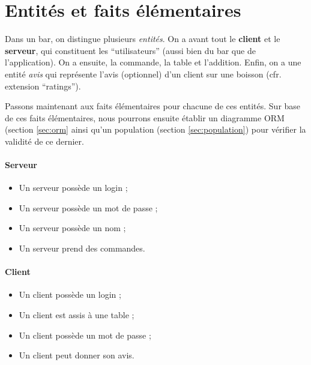 
\section{Entités et faits élémentaires}
Dans un bar, on distingue plusieurs \textit{entités}.
On a avant tout le \textbf{client} et le \textbf{serveur}, qui
constituent les ``utilisateurs'' (aussi bien du bar que de
l'application). On a ensuite, la commande, la table et l'addition.
Enfin, on a une entité \textit{avis} qui représente l'avis (optionnel)
d'un client sur une boisson (cfr. extension ``ratings'').

Passons maintenant aux faits élémentaires pour chacune
de ces entités. Sur base de ces faits élémentaires, nous pourrons
ensuite établir un diagramme ORM (section \ref{sec:orm} 
ainsi qu'un population (section \ref{sec:population})
pour vérifier la validité de ce dernier.

\paragraph{Serveur}
\begin{itemize}
	\item Un serveur possède un login ;
	\item Un serveur possède un mot de passe ;
	\item Un serveur possède un nom ;
	\item Un serveur prend des commandes.
\end{itemize}

\paragraph{Client}
\begin{itemize}
	\item Un client possède un login ;
	\item Un client est assis à une table ;
	\item Un client possède un mot de passe ;
	\item Un client peut donner son avis.
\end{itemize}

